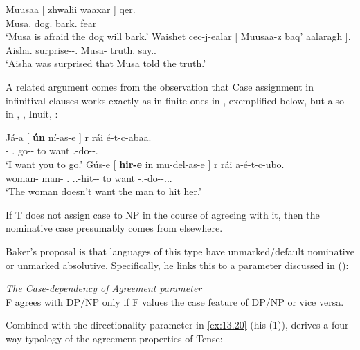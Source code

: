 \documentclass[output=paper]{langsci/langscibook}
\begin{document}
\ea%
    \label{ex:13.17} \parencite[551, 550]{Nichols2011}
	\ea
	\gll  Muusaa  [ zhwalii waaxar ]  qer.\\
            Musa.\Abs{} {} dog.\Abs{}  bark.\Vn{} {} fear\\
	\glt     ‘Musa is afraid the dog will bark.’
	\ex
	\gll  Waishet cec-j-ealar  [ Muusaa-z baq’  aalaragh ].\\
            Aisha.\Abs{}  surprise-\Jj-\Lv{}.\Pst{} {}  Musa-\Erg{} truth.\Abs{}  say.\Vn{}.\Lat{} {}\\
	\glt     ‘Aisha was surprised that Musa told the truth.’
    \z
\z

A related argument comes from the observation that Case assignment in
infinitival clauses works exactly as in finite ones in ,
exemplified below, but also in , , 
Inuit, :

\ea%
    \label{ex:13.18} \parencite[44]{Baker2015}
	\ea
	\gll   Já-a  [ \textbf{ún}  ní-as-e ]                r rái é-t-c-abaa.\\
    \Fsg-\Erg{} {} \Ssg.\Abs{}  go-\Inf{}-\Obl{} {} to want \Tsg.\Obj{}-do-\Npst-\Fsg{}.\Prs{}\\
	\glt     ‘I want you to go.’
	\ex
	\gll  Gús-e  [ \textbf{hir-e}  in mu-del-as-e ]                                     r rái a-é-t-c-ubo.\\
    woman-\Erg{} {}  man-\Erg{}  \Tsg{}.\Abs{} \Third.\glossF{}.\Obj{}-hit-\Inf{}-\Obl{} {} to want \Neg{}-\Tsg.\Obj{}-do-\Npst{}-\Third.\glossF.\Sbj{}.\Prs{}\\
	\glt     ‘The woman doesn’t want the man to hit her.’
    \z
\z

If T does not assign case to NP in the course of agreeing with it, then the
nominative case presumably comes from elsewhere.

Baker’s proposal is that languages of this type have unmarked/default
nominative or unmarked absolutive. Specifically, he links this to a parameter
discussed in \citeauthor{Baker2008} (\citeyear[155, (2)]{Baker2008}):

\ea%
    \label{ex:13.19}
    \emph{The Case-dependency of Agreement parameter}\\
    F agrees with DP/NP only if F values the case feature of DP/NP or vice
    versa.
\z

Combined with the directionality parameter in \eqref{ex:13.20} (his (1)),
\citealt{Baker2008} derives a four-way typology of the agreement properties of
Tense:
\end{document}
